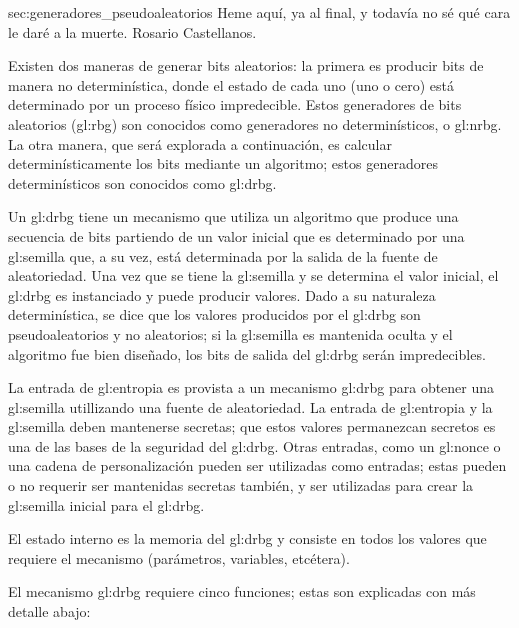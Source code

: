 %
%

  {sec:generadores_pseudoaleatorios}
{
  \epigrafe
  {%
    Heme aquí, ya al final, y todavía no sé qué cara le daré a la muerte.%
  }
  {%
    Rosario Castellanos.%
  }
}

Existen dos maneras de generar bits aleatorios: la primera es producir bits
de manera no determinística, donde el estado de cada uno (uno o cero) está
determinado por un proceso físico impredecible. Estos generadores de bits
aleatorios (\gls{gl:rbg}) son conocidos como generadores no determinísticos, o
\gls{gl:nrbg}. La otra manera, que será explorada a continuación, es calcular
determinísticamente los bits mediante un algoritmo; estos generadores
determinísticos son conocidos como \gls{gl:drbg}.

Un \gls{gl:drbg} tiene un mecanismo que utiliza un algoritmo que produce una
secuencia de bits partiendo de un valor inicial que es determinado por una
\gls{gl:semilla} que, a su vez, está determinada por la salida de la fuente de
aleatoriedad. Una vez que se tiene la \gls{gl:semilla} y se determina el valor
inicial, el \gls{gl:drbg} es instanciado y puede producir valores. Dado a su
naturaleza determinística, se dice que los valores producidos por el
\gls{gl:drbg} son pseudoaleatorios y no aleatorios; si la \gls{gl:semilla} es
mantenida oculta y el algoritmo fue bien diseñado, los bits de salida del
\gls{gl:drbg} serán impredecibles.


La entrada de \gls{gl:entropia} es provista a un mecanismo \gls{gl:drbg} para
obtener una \gls{gl:semilla} utillizando una fuente de aleatoriedad. La entrada
de \gls{gl:entropia} y la \gls{gl:semilla} deben mantenerse secretas; que estos
valores permanezcan secretos es una de las bases de la seguridad del
\gls{gl:drbg}. Otras entradas, como un \gls{gl:nonce} o una cadena de
personalización pueden ser utilizadas como entradas; estas pueden o no requerir
ser mantenidas secretas también, y ser utilizadas para crear la \gls{gl:semilla}
inicial para el \gls{gl:drbg}.

El estado interno es la memoria del \gls{gl:drbg} y consiste en todos los
valores que requiere el mecanismo (parámetros, variables, etcétera).

El mecanismo \gls{gl:drbg} requiere cinco funciones; estas son explicadas con
más detalle abajo:

